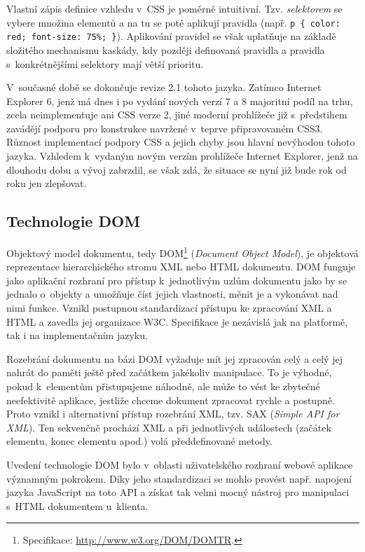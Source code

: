 Vlastní zápis definice vzhledu v~CSS je poměrně intuitivní. Tzv. {\it
selektorem} se vybere množina elementů a na tu se poté aplikují
pravidla (např. {\tt p \{ color: red; font-size: 75\%; \}}).
Aplikování pravidel se však uplatňuje na základě složitého mechanismu
kaskády, kdy později definovaná pravidla a pravidla s~konkrétnějšími
selektory mají větší prioritu. \cite{css2}

V~současné době se dokončuje revize 2.1 tohoto jazyka. Zatímco
Internet Explorer 6, jenž má dnes i po vydání nových verzí 7 a 8
majoritní podíl na trhu, zcela neimplementuje ani CSS verze 2, jiné
moderní prohlížeče již s~předstihem zavádějí podporu pro konstrukce
navržené v~teprve připravovaném CSS3. Různost implementací podpory CSS
a jejich chyby jsou hlavní nevýhodou tohoto jazyka. Vzhledem k~vydaným
novým verzím prohlížeče Internet Explorer, jenž na dlouhodu dobu
 a vývoj zabrzdil, se však zdá, že situace se nyní již
bude rok od roku jen zlepšovat.

\subsection{Technologie DOM}\label{dom}
Objektový model dokumentu, tedy DOM\footnote{Specifikace:
\url{http://www.w3.org/DOM/DOMTR}.} ({\it Document Object Model}), je
objektová reprezentace hierarchického stromu XML nebo HTML dokumentu. DOM
funguje jako aplikační rozhraní pro přístup k~jednotlivým uzlům
dokumentu jako by se jednalo o~objekty a umožňuje číst jejich
vlastnosti, měnit je a vykonávat nad nimi funkce. Vznikl postupnou
standardizací přístupu ke zpracování XML a HTML a zavedla jej
organizace W3C. Specifikace je nezávislá jak na platformě, tak i na
implementačním jazyku.

Rozebrání dokumentu na bázi DOM vyžaduje mít jej zpracován celý a
celý jej nahrát do paměti ještě před začátkem jakékoliv manipulace.
To je výhodné, pokud k~elementům přistupujeme náhodně, ale může to
vést ke zbytečné neefektivitě aplikace, jestliže chceme dokument
zpracovat rychle a postupně. Proto vznikl i alternativní
přístup rozebrání XML, tzv. SAX ({\it Simple API for XML}).
Ten sekvenčně prochází XML a při jednotlivých událostech (začátek
elementu, konec elementu apod.) volá předdefinované metody.

Uvedení technologie DOM bylo v~oblasti uživatelského rozhraní webové
aplikace významným pokrokem. Díky jeho standardizaci se mohlo
provést např. napojení jazyka JavaScript na toto API a získat tak velmi mocný
nástroj pro manipulaci s~HTML dokumentem u~klienta.

